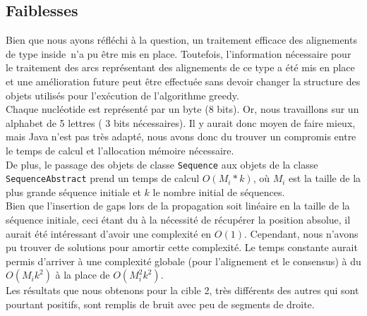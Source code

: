 \subsection{Faiblesses}

Bien que nous ayons réfléchi à la question, un traitement efficace des alignements de type \og inside\fg~n'a pu être mis en place. Toutefois, l'information nécessaire pour le traitement des arcs représentant des alignements de ce type a été mis en place et une amélioration future peut être effectuée sans devoir changer la structure des objets utilisés pour l'exécution de l'algorithme greedy.\\

Chaque nucléotide est représenté par un byte (8 bits). Or, nous travaillons sur un alphabet de 5 lettres ( 3 bits nécessaires). Il y aurait donc moyen de faire mieux, mais Java n'est pas très adapté, nous avons donc du trouver un compromis entre le temps de calcul et l'allocation mémoire nécessaire.\\

De plus, le passage des objets de classe \verb|Sequence| aux objets de la classe
\verb|SequenceAbstract| prend un temps de calcul $O(M_{i} * k)$, où $M_{i}$ est
la taille de la plus grande séquence initiale et $k$ le nombre initial de
séquences.\\

Bien que l'insertion de gaps lors de la propagation soit
linéaire en la taille de la séquence initiale, ceci étant du à la nécessité de
récupérer la position absolue, il aurait été intéressant d'avoir une complexité
en $O(1)$. Cependant, nous n'avons pu trouver de solutions pour amortir cette
complexité. Le temps constante aurait permis d'arriver à une complexité globale
(pour l'alignement et le consensus) à du $O(M_{i} k ^{2})$ à la place de
$O(M_{i}^{2} k^{2})$.\\

Les résultats que nous obtenons pour la cible 2, très différents des autres qui
sont pourtant positifs, sont remplis de bruit avec peu de segments de droite.
